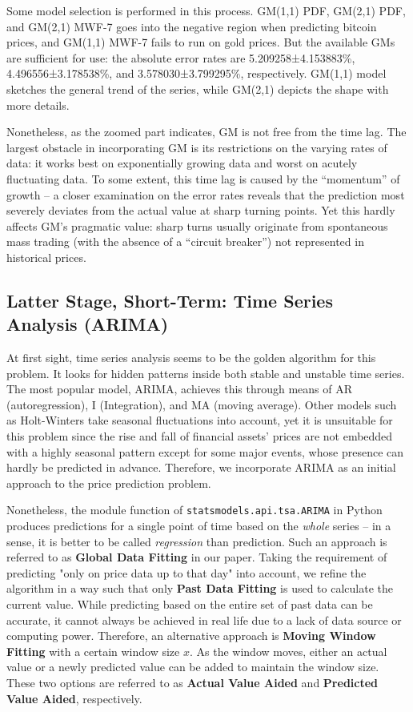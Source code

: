 \documentclass{mcmthesis}
\begin{document}
	Some model selection is performed in this process. GM(1,1) PDF, GM(2,1) PDF, and GM(2,1) MWF-7 goes into the negative region when predicting bitcoin prices, and GM(1,1) MWF-7 fails to run on gold prices. But the available GMs are sufficient for use: the absolute error rates are 5.209258±4.153883\%, 4.496556±3.178538\%, and 3.578030±3.799295\%, respectively. GM(1,1) model sketches the general trend of the series, while GM(2,1) depicts the shape with more details. 
	
	Nonetheless, as the zoomed part indicates, GM is not free from the time lag. The largest obstacle in incorporating GM is its restrictions on the varying rates of data: it works best on exponentially growing data and worst on acutely fluctuating data. To some extent, this time lag is caused by the ``momentum'' of growth -- a closer examination on the error rates reveals that the prediction most severely deviates from the actual value at sharp turning points. Yet this hardly affects GM's pragmatic value: sharp turns usually originate from spontaneous mass trading (with the absence of a ``circuit breaker'') not represented in historical prices. 
	
	\subsection{Latter Stage, Short-Term: Time Series Analysis (ARIMA)}
	\label{sec:3.1}
	
	At first sight, time series analysis seems to be the golden algorithm for this problem. It looks for hidden patterns inside both stable and unstable time series. The most popular model, ARIMA, achieves this through means of AR (autoregression), I (Integration), and MA (moving average). Other models such as Holt-Winters take seasonal fluctuations into account, yet it is unsuitable for this problem since the rise and fall of financial assets' prices are not embedded with a highly seasonal pattern except for some major events, whose presence can hardly be predicted in advance. Therefore, we incorporate ARIMA as an initial approach to the price prediction problem. 
	
	Nonetheless, the module function of \verb|statsmodels.api.tsa.ARIMA| in Python produces predictions for a single point of time based on the \textit{whole} series -- in a sense, it is better to be called \textit{regression} than prediction. Such an approach is referred to as \textbf{Global Data Fitting} in our paper. Taking the requirement of predicting "only on price data up to that day" into account, we refine the algorithm in a way such that only \textbf{Past Data Fitting} is used to calculate the current value. While predicting based on the entire set of past data can be accurate, it cannot always be achieved in real life due to a lack of data source or computing power. Therefore, an alternative approach is \textbf{Moving Window Fitting} with a certain window size $x$. As the window moves, either an actual value or a newly predicted value can be added to maintain the window size. These two options are referred to as \textbf{Actual Value Aided} and \textbf{Predicted Value Aided}, respectively. 
	
\end{document}
